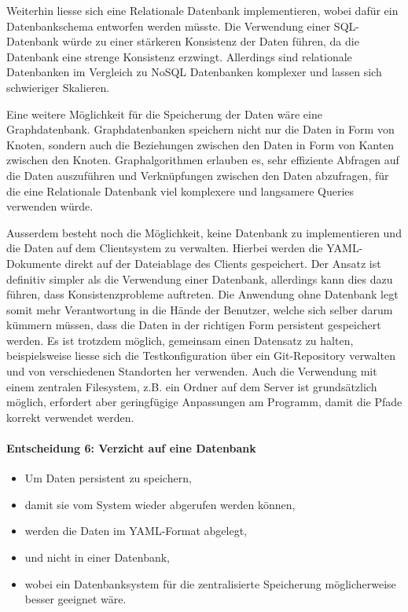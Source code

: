 \documentclass[
	ngerman,
	toc=listof, %
	toc=bibliography, %
	footnotes=multiple, %
	parskip=half, %
	numbers=noendperiod %
]{scrartcl}
\begin{document}
		Weiterhin liesse sich eine Relationale Datenbank implementieren, wobei dafür ein Datenbankschema entworfen werden müsste.
		Die Verwendung einer SQL-Datenbank würde zu einer stärkeren Konsistenz der Daten führen, da die Datenbank eine strenge Konsistenz erzwingt.
		Allerdings sind relationale Datenbanken im Vergleich zu NoSQL Datenbanken komplexer und lassen sich schwieriger Skalieren.

		Eine weitere Möglichkeit für die Speicherung der Daten wäre eine Graphdatenbank. Graphdatenbanken speichern nicht nur die Daten in Form von Knoten, sondern auch die Beziehungen zwischen den Daten in Form von Kanten zwischen den Knoten.
		Graphalgorithmen erlauben es, sehr effiziente Abfragen auf die Daten auszuführen und Verknüpfungen zwischen den Daten abzufragen, für die eine Relationale Datenbank viel komplexere und langsamere Queries verwenden würde.

		Ausserdem besteht noch die Möglichkeit, keine Datenbank zu implementieren und die Daten auf dem Clientsystem zu verwalten.
		Hierbei werden die YAML-Dokumente direkt auf der Dateiablage des Clients gespeichert. 
		Der Ansatz ist definitiv simpler als die Verwendung einer Datenbank, allerdings kann dies dazu führen, dass Konsistenzprobleme auftreten.
		Die Anwendung ohne Datenbank legt somit mehr Verantwortung in die Hände der Benutzer, welche sich selber darum kümmern müssen, dass die Daten in der richtigen Form persistent gespeichert werden.
		Es ist trotzdem möglich, gemeinsam einen Datensatz zu halten, beispielsweise liesse sich die Testkonfiguration über ein Git-Repository verwalten und von verschiedenen Standorten her verwenden.
		Auch die Verwendung mit einem zentralen Filesystem, z.B. ein Ordner auf dem Server ist grundsätzlich möglich, erfordert aber geringfügige Anpassungen am Programm, damit die Pfade korrekt verwendet werden.

		\paragraph{Entscheidung 6: Verzicht auf eine Datenbank}
		\begin{itemize}
			\item Um Daten persistent zu speichern, 
			\item damit sie vom System wieder abgerufen werden können,
			\item werden die Daten im YAML-Format abgelegt,
			\item und nicht in einer Datenbank,
			\item wobei ein Datenbanksystem für die zentralisierte Speicherung möglicherweise besser geeignet wäre.
		\end{itemize}
		\newpage
\end{document}
